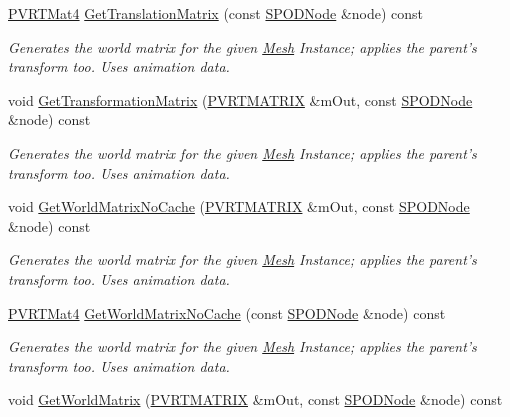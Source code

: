 \begin{DoxyCompactItemize}
\hyperlink{struct_p_v_r_t_mat4}{P\+V\+R\+T\+Mat4} \hyperlink{class_c_p_v_r_t_model_p_o_d_a761cc0208fc41641bd5fafbe87ab71c7}{Get\+Translation\+Matrix} (const \hyperlink{struct_s_p_o_d_node}{S\+P\+O\+D\+Node} \&node) const 
\begin{DoxyCompactList}\small\item\em Generates the world matrix for the given \hyperlink{class_mesh}{Mesh} Instance; applies the parent's transform too. Uses animation data. \end{DoxyCompactList}\item 
void \hyperlink{class_c_p_v_r_t_model_p_o_d_ab614a904956547c6cd7c623046f888b2}{Get\+Transformation\+Matrix} (\hyperlink{class_p_v_r_t_m_a_t_r_i_xf}{P\+V\+R\+T\+M\+A\+T\+R\+I\+X} \&m\+Out, const \hyperlink{struct_s_p_o_d_node}{S\+P\+O\+D\+Node} \&node) const 
\begin{DoxyCompactList}\small\item\em Generates the world matrix for the given \hyperlink{class_mesh}{Mesh} Instance; applies the parent's transform too. Uses animation data. \end{DoxyCompactList}\item 
void \hyperlink{class_c_p_v_r_t_model_p_o_d_a5d8930577009f9c922665522ca9bb1c3}{Get\+World\+Matrix\+No\+Cache} (\hyperlink{class_p_v_r_t_m_a_t_r_i_xf}{P\+V\+R\+T\+M\+A\+T\+R\+I\+X} \&m\+Out, const \hyperlink{struct_s_p_o_d_node}{S\+P\+O\+D\+Node} \&node) const 
\begin{DoxyCompactList}\small\item\em Generates the world matrix for the given \hyperlink{class_mesh}{Mesh} Instance; applies the parent's transform too. Uses animation data. \end{DoxyCompactList}\item 
\hyperlink{struct_p_v_r_t_mat4}{P\+V\+R\+T\+Mat4} \hyperlink{class_c_p_v_r_t_model_p_o_d_ad13e0fe08758d7f7bbfd71c3b765600e}{Get\+World\+Matrix\+No\+Cache} (const \hyperlink{struct_s_p_o_d_node}{S\+P\+O\+D\+Node} \&node) const 
\begin{DoxyCompactList}\small\item\em Generates the world matrix for the given \hyperlink{class_mesh}{Mesh} Instance; applies the parent's transform too. Uses animation data. \end{DoxyCompactList}\item 
void \hyperlink{class_c_p_v_r_t_model_p_o_d_a275eceb98a361d91d77e15b54238a8de}{Get\+World\+Matrix} (\hyperlink{class_p_v_r_t_m_a_t_r_i_xf}{P\+V\+R\+T\+M\+A\+T\+R\+I\+X} \&m\+Out, const \hyperlink{struct_s_p_o_d_node}{S\+P\+O\+D\+Node} \&node) const 

\end{DoxyCompactItemize}
